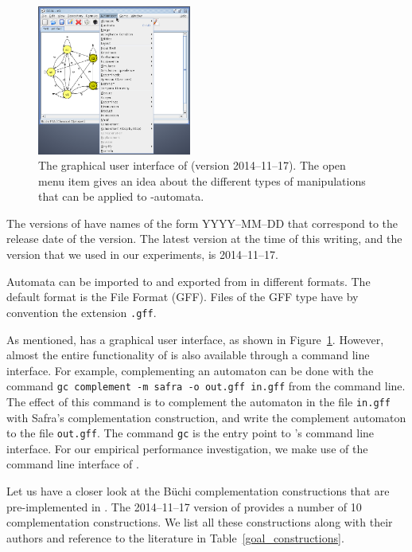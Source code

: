 \begin{figure}[htb]
\centering
\includegraphics[width=0.45\textwidth]{figures/goal.png}
\caption{The graphical user interface of \goal{} (version 2014--11--17). The open menu item gives an idea about the different types of manipulations that can be applied to \om-automata.}
\label{goal_gui}
\end{figure}

The versions of \goal{} have names of the form YYYY--MM--DD that correspond to the release date of the version. The latest version at the time of this writing, and the version that we used in our experiments, is 2014--11--17.

Automata can be imported to and exported from \goal{} in different formats. The default format is the \goal{} File Format (GFF). Files of the GFF type have by convention the extension \texttt{.gff}. 

As mentioned, \goal{} has a graphical user interface, as shown in Figure~\ref{goal_gui}. However, almost the entire functionality of \goal{} is also available through a command line interface. For example, complementing an automaton can  be done with the command \texttt{gc complement -m safra -o out.gff in.gff} from the command line. The effect of this command is to complement the automaton in the file \texttt{in.gff} with Safra's complementation construction, and write the complement automaton to the file \texttt{out.gff}. The command \texttt{gc} is the entry point to \goal's command line interface. For our empirical performance investigation, we make use of the command line interface of \goal.

Let us have a closer look at the Büchi complementation constructions that are pre-implemented in \goal. The 2014--11--17 version of \goal{} provides a number of 10 complementation constructions. We list all these constructions along with their authors and reference to the literature in Table~\ref{goal_constructions}.

